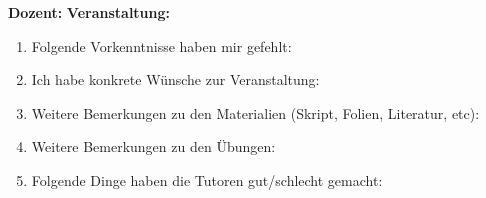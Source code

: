 \documentclass[10pt,a4paper]{article}
\begin{document}
\textbf{Dozent:}\hspace{0.2cm} \underline{\hspace{5cm}} \hspace{1.5pt} \textbf{Veranstaltung:}\hspace{0.1cm} \underline{\hspace{7cm}}
\begin{enumerate}
	\item Folgende Vorkenntnisse haben mir gefehlt:
	
	\underline{\hspace{15.9cm}}
	
	\underline{\hspace{15.9cm}}
	\vspace{0.1pt}
	\item Ich habe konkrete Wünsche zur Veranstaltung:
	
	\underline{\hspace{15.9cm}}
	
	\underline{\hspace{15.9cm}}
	
	\underline{\hspace{15.9cm}}
	\vspace{0.1pt}
	
	\item Weitere Bemerkungen zu den Materialien (Skript, Folien, Literatur, etc):
	
	\underline{\hspace{15.9cm}}
	
	\underline{\hspace{15.9cm}}
	
	\underline{\hspace{15.9cm}}
	\vspace{0.1pt}
	
	\item Weitere Bemerkungen zu den Übungen:
	
	\underline{\hspace{15.9cm}}
	
	\underline{\hspace{15.9cm}}
	
	\underline{\hspace{15.9cm}}
	\vspace{0.1pt}
	
	\item Folgende Dinge haben die Tutoren gut/schlecht gemacht:
	
	\underline{\hspace{15.9cm}}
	

\end{enumerate}
\end{document}
